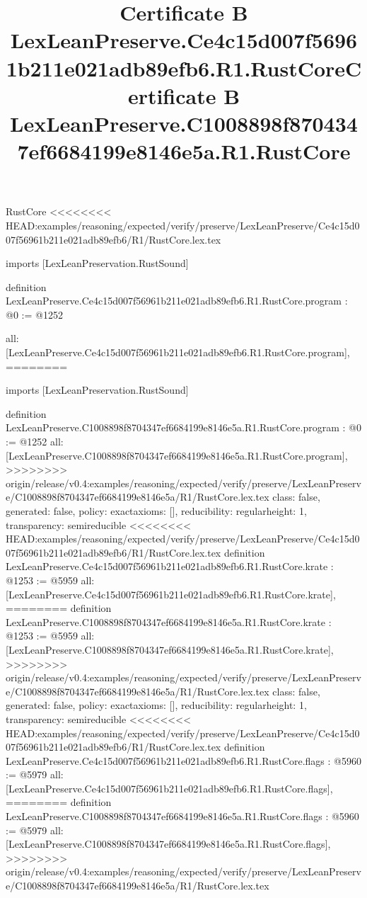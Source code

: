 \begin{lexlean}{RustCore}
<<<<<<<< HEAD:examples/reasoning/expected/verify/preserve/LexLeanPreserve/Ce4c15d007f56961b211e021adb89efb6/R1/RustCore.lex.tex
\title{Certificate B LexLeanPreserve.Ce4c15d007f56961b211e021adb89efb6.R1.RustCore}
\begin{coremodule}
imports [LexLeanPreservation.RustSound]

definition LexLeanPreserve.Ce4c15d007f56961b211e021adb89efb6.R1.RustCore.program : @0 := @1252 {
  all: [LexLeanPreserve.Ce4c15d007f56961b211e021adb89efb6.R1.RustCore.program],
========
\title{Certificate B LexLeanPreserve.C1008898f8704347ef6684199e8146e5a.R1.RustCore}
\begin{coremodule}
imports [LexLeanPreservation.RustSound]

definition LexLeanPreserve.C1008898f8704347ef6684199e8146e5a.R1.RustCore.program : @0 := @1252 {
  all: [LexLeanPreserve.C1008898f8704347ef6684199e8146e5a.R1.RustCore.program],
>>>>>>>> origin/release/v0.4:examples/reasoning/expected/verify/preserve/LexLeanPreserve/C1008898f8704347ef6684199e8146e5a/R1/RustCore.lex.tex
  class: false,
  generated: false,
  policy: exact{axioms: []},
  reducibility: regular{height: 1},
  transparency: semireducible
}
<<<<<<<< HEAD:examples/reasoning/expected/verify/preserve/LexLeanPreserve/Ce4c15d007f56961b211e021adb89efb6/R1/RustCore.lex.tex
definition LexLeanPreserve.Ce4c15d007f56961b211e021adb89efb6.R1.RustCore.krate : @1253 := @5959 {
  all: [LexLeanPreserve.Ce4c15d007f56961b211e021adb89efb6.R1.RustCore.krate],
========
definition LexLeanPreserve.C1008898f8704347ef6684199e8146e5a.R1.RustCore.krate : @1253 := @5959 {
  all: [LexLeanPreserve.C1008898f8704347ef6684199e8146e5a.R1.RustCore.krate],
>>>>>>>> origin/release/v0.4:examples/reasoning/expected/verify/preserve/LexLeanPreserve/C1008898f8704347ef6684199e8146e5a/R1/RustCore.lex.tex
  class: false,
  generated: false,
  policy: exact{axioms: []},
  reducibility: regular{height: 1},
  transparency: semireducible
}
<<<<<<<< HEAD:examples/reasoning/expected/verify/preserve/LexLeanPreserve/Ce4c15d007f56961b211e021adb89efb6/R1/RustCore.lex.tex
definition LexLeanPreserve.Ce4c15d007f56961b211e021adb89efb6.R1.RustCore.flags : @5960 := @5979 {
  all: [LexLeanPreserve.Ce4c15d007f56961b211e021adb89efb6.R1.RustCore.flags],
========
definition LexLeanPreserve.C1008898f8704347ef6684199e8146e5a.R1.RustCore.flags : @5960 := @5979 {
  all: [LexLeanPreserve.C1008898f8704347ef6684199e8146e5a.R1.RustCore.flags],
>>>>>>>> origin/release/v0.4:examples/reasoning/expected/verify/preserve/LexLeanPreserve/C1008898f8704347ef6684199e8146e5a/R1/RustCore.lex.tex
}}}
\end{coremodule}}
\end{coremodule}
\end{lexlean}
